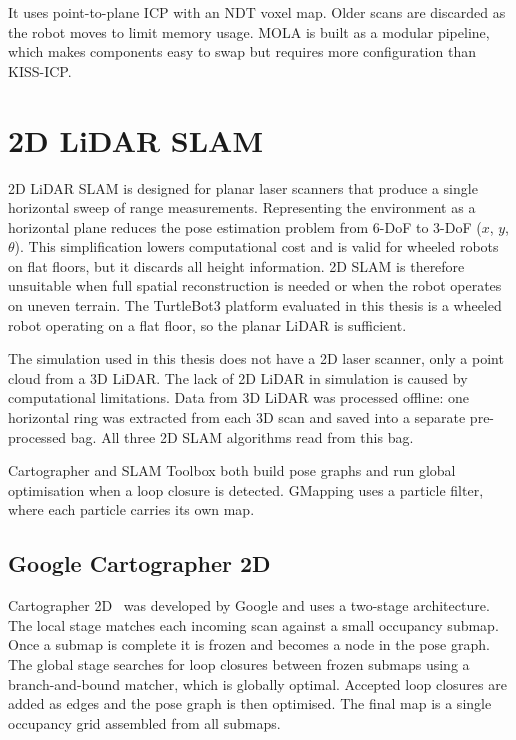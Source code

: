 It uses point-to-plane ICP with an NDT voxel map.
Older scans are discarded as the robot moves to limit memory usage.
MOLA is built as a modular pipeline, which makes components easy to swap but requires more
configuration than KISS-ICP.

\section{2D LiDAR SLAM}

2D LiDAR SLAM is designed for planar laser scanners that produce a single
horizontal sweep of range measurements. Representing the environment as a
horizontal plane reduces the pose estimation problem from 6-DoF to 3-DoF
($x$, $y$, $\theta$). This simplification lowers computational cost and is valid for wheeled robots
on flat floors, but it discards all
height information. 2D SLAM is therefore unsuitable when full spatial reconstruction is needed or
when the robot operates on uneven terrain. The TurtleBot3 platform evaluated
in this thesis is a wheeled robot operating on a flat floor, so the planar
LiDAR is sufficient.

The simulation used in this thesis does not have a 2D laser scanner, only a point cloud from a
3D LiDAR. The lack of 2D LiDAR in simulation is caused by computational limitations.
Data from 3D LiDAR was processed offline: one horizontal ring was extracted
from each 3D scan and saved into a separate pre-processed bag. All three 2D
SLAM algorithms read from this bag.

Cartographer and SLAM Toolbox both build pose graphs and run global
optimisation when a loop closure is detected. GMapping uses a particle filter,
where each particle carries its own map.

\subsection{Google Cartographer 2D}

Cartographer 2D~\cite{hess2016cartographer} was developed by Google and uses a two-stage architecture.
The local stage matches each incoming scan against a small occupancy submap. 
Once a submap is complete it is frozen and
becomes a node in the pose graph. The global stage searches for loop closures
between frozen submaps using a branch-and-bound matcher, which is globally optimal.
Accepted loop closures are added as edges and the pose graph is then
optimised. The final map is a single occupancy grid assembled from all submaps.

